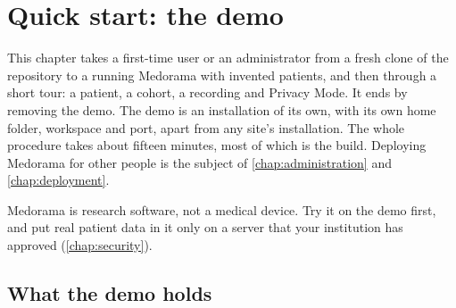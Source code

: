 \chapter{Quick start: the demo}
\label{chap:quickstart}

This chapter takes a first-time user or an administrator from a fresh clone of the repository
to a running Medorama with invented patients, and then through a short tour: a patient, a
cohort, a recording and Privacy Mode. It ends by removing the demo. The demo is an installation
of its own, with its own home folder, workspace and port, apart from any site's installation. The whole procedure takes
about fifteen minutes, most of which is the build. Deploying Medorama for other people is the
subject of \cref{chap:administration} and \cref{chap:deployment}.

\begin{note}
Medorama is research software, not a medical device. Try it on the demo first, and put real
patient data in it only on a server that your institution has approved (\cref{chap:security}).
\end{note}

\section{What the demo holds}
\label{sec:quickstart-demo}

